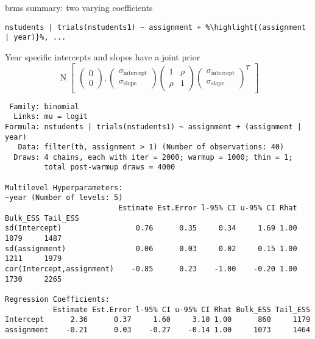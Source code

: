 \documentclass[finnish,english,t]{beamer}
\newcommand{\reducedstrut}{\vrule width 0pt height .9\ht\strutbox depth .9\dp\strutbox\relax}
\newcommand{\highlight}[1]{%
  \begingroup
  \setlength{\fboxsep}{0pt}%
  \colorbox{yellow!30}{\reducedstrut\detokenize{#1}\/}%
  \endgroup
}
\DeclareMathOperator{\N}{N}
\begin{document}
\begin{frame}[fragile]{brms summary: two varying coefficients}

  \vspace{-0.5\baselineskip}
\begin{verbatim}
nstudents | trials(nstudents1) ~ assignment + %\highlight{(assignment | year)}%, ...
\end{verbatim}

  \vspace{-0.5\baselineskip}
  Year specific intercepts and slopes have a joint prior
$$
  \N
\begin{bmatrix}
  \begin{pmatrix}
    0\\0
  \end{pmatrix},
\begin{pmatrix}\sigma_\mathrm{intercept} \\ \sigma_\mathrm{slope}\end{pmatrix}
\begin{pmatrix}1 & \rho \\ \rho & 1\end{pmatrix}
\begin{pmatrix}\sigma_\mathrm{intercept} \\ \sigma_\mathrm{slope} \end{pmatrix}^T
\end{bmatrix}
$$

\vspace{-\baselineskip}
{\color{lightgray}\hrulefill}

  \vspace{-0.5\baselineskip}
\begin{verbatim}
 Family: binomial 
  Links: mu = logit 
Formula: nstudents | trials(nstudents1) ~ assignment + (assignment | year) 
   Data: filter(tb, assignment > 1) (Number of observations: 40) 
  Draws: 4 chains, each with iter = 2000; warmup = 1000; thin = 1;
         total post-warmup draws = 4000

Multilevel Hyperparameters:
~year (Number of levels: 5) 
                          Estimate Est.Error l-95% CI u-95% CI Rhat Bulk_ESS Tail_ESS
sd(Intercept)                 0.76      0.35     0.34     1.69 1.00     1079     1487
sd(assignment)                0.06      0.03     0.02     0.15 1.00     1211     1979
cor(Intercept,assignment)    -0.85      0.23    -1.00    -0.20 1.00     1730     2265

Regression Coefficients:
           Estimate Est.Error l-95% CI u-95% CI Rhat Bulk_ESS Tail_ESS
Intercept      2.36      0.37     1.60     3.10 1.00      860     1179
assignment    -0.21      0.03    -0.27    -0.14 1.00     1073     1464
\end{verbatim}

\end{frame}
\end{document}
